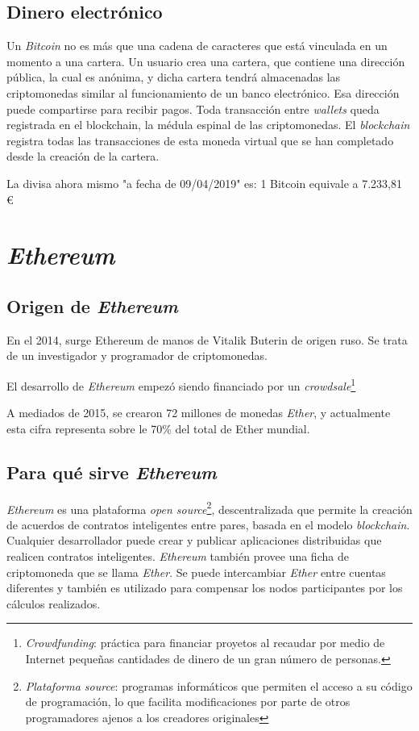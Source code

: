 \subsection{Dinero electrónico}

Un \textit{Bitcoin} no es más que una cadena de caracteres que está vinculada en un momento a una cartera. 
Un usuario crea una cartera, que contiene una dirección pública, la cual es anónima, y dicha cartera tendrá almacenadas las criptomonedas similar al funcionamiento de un banco electrónico. Esa dirección puede compartirse para recibir pagos.
Toda transacción entre \textit{wallets} queda registrada en el blockchain, la médula espinal de las criptomonedas. El \textit{blockchain} registra todas las transacciones de esta moneda virtual que se han completado desde la creación de la cartera.

La divisa ahora mismo "a fecha de 09/04/2019" es: 1 Bitcoin equivale a 7.233,81 \euro

\section{\textit{Ethereum}}
\subsection{Origen de \textit{Ethereum}}

En el 2014, surge Ethereum\cite{ethereum} de manos de Vitalik Buterin de origen ruso. Se trata de un investigador y programador de criptomonedas. 

El desarrollo de \textit{Ethereum} empezó siendo financiado por un \textit{crowdsale}\footnote{\textit{Crowdfunding}\cite{crowdfunding}: práctica para financiar proyetos al recaudar por medio de Internet pequeñas cantidades de dinero de un gran número de personas.}

A mediados de 2015, se crearon 72 millones de monedas \textit{Ether}, y actualmente esta cifra representa sobre le 70\% del total de Ether mundial.
 
\subsection{Para qué sirve \textit{Ethereum}}

\textit{Ethereum}\cite{ethereum1} es una plataforma \textit{open source}\footnote{\textit{Plataforma source}: programas informáticos que permiten el acceso a su código de programación, lo que facilita modificaciones por parte de otros programadores ajenos a los creadores originales }, descentralizada que permite la creación de acuerdos de contratos inteligentes entre pares, basada en el modelo \textit{blockchain}.
Cualquier desarrollador puede crear y publicar aplicaciones distribuidas que realicen contratos inteligentes. 
\textit{Ethereum} también provee una ficha de criptomoneda que se llama \textit{Ether}.
Se puede intercambiar \textit{Ether} entre cuentas diferentes y también es utilizado para compensar los nodos participantes por los cálculos realizados.

